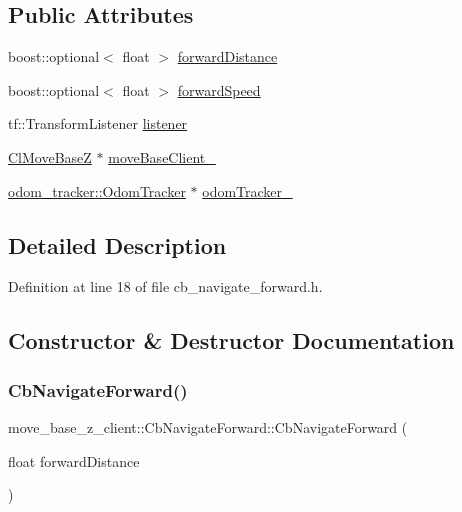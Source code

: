 \subsection*{Public Attributes}
\begin{DoxyCompactItemize}
\item 
boost\+::optional$<$ float $>$ \hyperlink{classmove__base__z__client_1_1CbNavigateForward_ab3097d686b5a82b4f650bc5175d8ab73}{forward\+Distance}
\item 
boost\+::optional$<$ float $>$ \hyperlink{classmove__base__z__client_1_1CbNavigateForward_aa0753177c2415f8e0b221be754d63197}{forward\+Speed}
\item 
tf\+::\+Transform\+Listener \hyperlink{classmove__base__z__client_1_1CbNavigateForward_afa40fd805d66eb09e9b4b1bd8356b2a5}{listener}
\item 
\hyperlink{classmove__base__z__client_1_1ClMoveBaseZ}{Cl\+Move\+BaseZ} $\ast$ \hyperlink{classmove__base__z__client_1_1CbNavigateForward_ab3b4592cd7f30b490a0549f2ee67c389}{move\+Base\+Client\+\_\+}
\item 
\hyperlink{classmove__base__z__client_1_1odom__tracker_1_1OdomTracker}{odom\+\_\+tracker\+::\+Odom\+Tracker} $\ast$ \hyperlink{classmove__base__z__client_1_1CbNavigateForward_a1472ca04aac37644667e8833668a5bab}{odom\+Tracker\+\_\+}
\end{DoxyCompactItemize}


\subsection{Detailed Description}


Definition at line 18 of file cb\+\_\+navigate\+\_\+forward.\+h.



\subsection{Constructor \& Destructor Documentation}
\mbox{\label{classmove__base__z__client_1_1CbNavigateForward_a14f25162a57acb3d0a0e693ec77b08b7}} 
\subsubsection{\texorpdfstring{Cb\+Navigate\+Forward()}{CbNavigateForward()}\hspace{0.1cm}{\footnotesize\ttfamily [1/2]}}
{\footnotesize\ttfamily move\+\_\+base\+\_\+z\+\_\+client\+::\+Cb\+Navigate\+Forward\+::\+Cb\+Navigate\+Forward (\begin{DoxyParamCaption}\item[{float}]{forward\+Distance }\end{DoxyParamCaption})}



